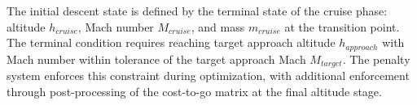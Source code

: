 The initial descent state is defined by the terminal state of the cruise phase: altitude $h_{cruise}$, Mach number $M_{cruise}$, and mass $m_{cruise}$ at the transition point. The terminal condition requires reaching target approach altitude $h_{approach}$ with Mach number within tolerance of the target approach Mach $M_{target}$. The penalty system enforces this constraint during optimization, with additional enforcement through post-processing of the cost-to-go matrix at the final altitude stage.
